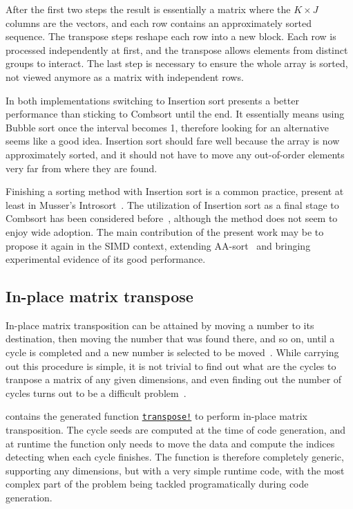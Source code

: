 \documentclass{juliacon}
\begin{document}
After the first two steps the result is essentially a matrix where the $K\times J$ columns are the vectors, and each row contains an approximately sorted sequence. The transpose steps reshape each row into a new block. Each row is processed independently at first, and the transpose allows elements from distinct groups to interact. The last step is necessary to ensure the whole array is sorted, not viewed anymore as a matrix with independent rows.

In both implementations switching to Insertion sort presents a better performance than sticking to Combsort until the end. It essentially means using Bubble sort once the interval becomes 1, therefore looking for an alternative seems like a good idea. Insertion sort should fare well because the array is now approximately sorted, and it should not have to move any out-of-order elements very far from where they are found.

Finishing a sorting method with Insertion sort is a common practice, present at least in Musser's Introsort~\cite{musser1997introspective}. The utilization of Insertion sort as a final stage to Combsort has been considered before~\cite{combwiki,INCERPI198737}, although the method does not seem to enjoy wide adoption. The main contribution of the present work may be to propose it again in the SIMD context, extending AA-sort~\cite{DBLP:conf/IEEEpact/InoueMKN07,DBLP:journals/pvldb/InoueT15} and bringing experimental evidence of its good performance.

\subsection{In-place matrix transpose}
%
In-place matrix transposition can be attained by moving a number to its destination, then moving the number that was found there, and so on, until a cycle is completed and a new number is selected to be moved~\cite{10.1093/comjnl/2.1.47}. While carrying out this procedure is simple, it is not trivial to find out what are the cycles to tranpose a matrix of any given dimensions, and even finding out the number of cycles turns out to be a difficult problem~\cite[Sec. 1.3.3, Ex. 12]{DBLP:books/lib/Knuth97}.

\chipsort contains the generated function \href{https://github.com/nlw0/ChipSort.jl/blob/10eb1a962e720aee2bf8733c832468b51a782c1a/src/transpose-vecs.jl#L19}{\tt transpose!} to perform in-place matrix transposition. The cycle seeds are computed at the time of code generation, and at runtime the function only needs to move the data and compute the indices detecting when each cycle finishes. The function is therefore completely generic, supporting any dimensions, but with a very simple runtime code, with the most complex part of the problem being tackled programatically during code generation.
\end{document}
